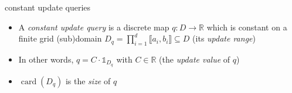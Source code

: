 \documentclass[
    t,10pt,
    handout
]{beamer}
\DeclareMathOperator{\card}{card}
\begin{document}
\begin{frame}
    \begin{definition*}{constant update queries}
        \begin{itemize}[<+->]
            \item A \emph{constant update query} is a discrete map \( q : D \to \mathbb{R} \) which is constant on a finite grid (sub)domain \( D_q = \prod_{i=1}^d \llbracket a_i, b_i \rrbracket \subseteq D \) (its \emph{update range})
            \item In other words, \( q = C \cdot \mathbb{1}_{D_q} \) with \( C \in \mathbb{R} \) (the \emph{update value} of \( q \))
            \item \( \card(D_q) \) is the \emph{size} of \( q \) 
        \end{itemize}
    \end{definition*}

    \vspace{.2cm}

\end{frame}
\end{document}
